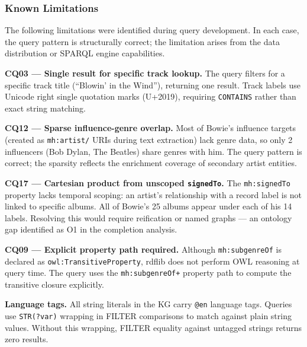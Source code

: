 \subsubsection{Known Limitations}

The following limitations were identified during query development. In each case, the query pattern is structurally correct; the limitation arises from the data distribution or SPARQL engine capabilities.

\textbf{CQ03 --- Single result for specific track lookup.} The query filters for a specific track title (``Blowin' in the Wind''), returning one result. Track labels use Unicode right single quotation marks (U+2019), requiring \texttt{CONTAINS} rather than exact string matching.

\textbf{CQ12 --- Sparse influence-genre overlap.} Most of Bowie's influence targets (created as \texttt{mh:artist/} URIs during text extraction) lack genre data, so only 2 influencers (Bob Dylan, The Beatles) share genres with him. The query pattern is correct; the sparsity reflects the enrichment coverage of secondary artist entities.

\textbf{CQ17 --- Cartesian product from unscoped \texttt{signedTo}.} The \texttt{mh:signedTo} property lacks temporal scoping: an artist's relationship with a record label is not linked to specific albums. All of Bowie's 25 albums appear under each of his 14 labels. Resolving this would require reification or named graphs --- an ontology gap identified as O1 in the completion analysis.

\textbf{CQ09 --- Explicit property path required.} Although \texttt{mh:subgenreOf} is declared as \texttt{owl:TransitiveProperty}, rdflib does not perform OWL reasoning at query time. The query uses the \texttt{mh:subgenreOf+} property path to compute the transitive closure explicitly.

\textbf{Language tags.} All string literals in the KG carry \texttt{@en} language tags. Queries use \texttt{STR(?var)} wrapping in FILTER comparisons to match against plain string values. Without this wrapping, FILTER equality against untagged strings returns zero results.
